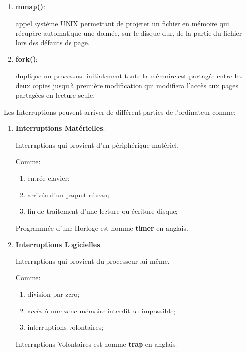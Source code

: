 \documentclass{article}
\begin{document}
\begin{enumerate}[rightmargin=\leftmargin]
    \item \textbf{mmap()}:
    \begin{definition}
        appel système UNIX permettant de projeter un fichier en mémoire qui récupère automatique une donnée, sur le disque dur, de la partie du fichier lors des défauts de page.
    \end{definition}
    
    \item \textbf{fork()}:
    \begin{definition}
        duplique un processus. initialement toute la mémoire est partagée entre les deux copies jusqu'à première modification qui modifiera l'accès aux pages partagées en lecture seule.
    \end{definition}
\end{enumerate}
Les Interruptions peuvent arriver de différent parties de l'ordinateur comme:
\begin{enumerate}[noitemsep, rightmargin=\leftmargin]
    \item \textbf{Interruptions Matérielles}:
    \begin{definition}
        Interruptions qui provient d'un périphérique matériel.
    \end{definition}
    Comme:
    \begin{enumerate}[noitemsep]
        \item entrée clavier;
        \item arrivée d'un paquet réseau;
        \item fin de traitement d'une lecture ou écriture disque;
    \end{enumerate}
    \begin{remark}
        Programmée d'une Horloge est nomme \textbf{timer} en anglais.
    \end{remark}
    
    \item \textbf{Interruptions Logicielles}
    \begin{definition}
        Interruptions qui provient du processeur lui-même.
    \end{definition}
    Comme:
    \begin{enumerate}[noitemsep]
        \item division par zéro;
        \item accès à une zone mémoire interdit ou impossible;
        \item interruptions volontaires;
    \end{enumerate}
    \begin{remark}
        Interruptions Volontaires est nomme \textbf{trap} en anglais.
    \end{remark}
\end{enumerate}
\end{document}
